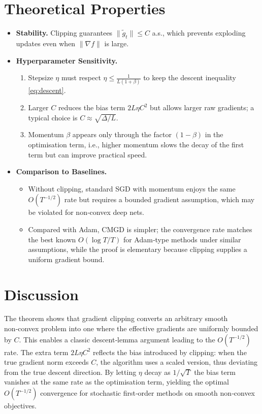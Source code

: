 \documentclass{article}
\begin{document}
\section*{Theoretical Properties}
\begin{itemize}
\item \textbf{Stability.} Clipping guarantees $\|\tilde g_t\|\le C$ a.s., which prevents exploding updates even when $\|\nabla f\|$ is large.
\item \textbf{Hyperparameter Sensitivity.}
    \begin{enumerate}
    \item Stepsize $\eta$ must respect $\eta\le \frac{1}{L(1+\beta)}$ to keep the descent inequality \eqref{eq:descent}.
    \item Larger $C$ reduces the bias term $2L\eta C^2$ but allows larger raw gradients; a typical choice is $C\approx \sqrt{\Delta/L}$.
    \item Momentum $\beta$ appears only through the factor $(1-\beta)$ in the optimisation term, i.e., higher momentum slows the decay of the first term but can improve practical speed.
    \end{enumerate}
\item \textbf{Comparison to Baselines.}
    \begin{itemize}
    \item Without clipping, standard SGD with momentum enjoys the same $O(T^{-1/2})$ rate but requires a bounded gradient assumption, which may be violated for non‑convex deep nets.
    \item Compared with Adam, CMGD is simpler; the convergence rate matches the best known $O(\log T/T)$ for Adam‑type methods under similar assumptions, while the proof is elementary because clipping supplies a uniform gradient bound.
    \end{itemize}
\end{itemize}

\section*{Discussion}
The theorem shows that gradient clipping converts an arbitrary smooth non‑convex problem into one where the effective gradients are uniformly bounded by $C$. This enables a classic descent‑lemma argument leading to the $O(T^{-1/2})$ rate. The extra term $2L\eta C^2$ reflects the bias introduced by clipping: when the true gradient norm exceeds $C$, the algorithm uses a scaled version, thus deviating from the true descent direction. By letting $\eta$ decay as $1/\sqrt{T}$ the bias term vanishes at the same rate as the optimisation term, yielding the optimal $O(T^{-1/2})$ convergence for stochastic first‑order methods on smooth non‑convex objectives.
\end{document}
